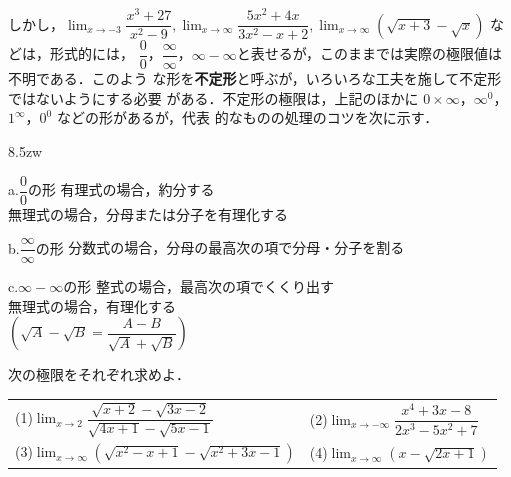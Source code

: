 しかし，$\lim_{x\to -3}\dfrac{x^{3}+27}{x^{2}-9}, \lim_{x\rightarrow\infty}\dfrac{5x^{2}+4x}{3x^{2}-x+2}, \lim_{x\rightarrow\infty} (\sqrt{x+3}-\sqrt{x})$ などは，形式的には，
$\dfrac{0}{0}$，$\dfrac{\infty}{\infty}$，$\infty-\infty$と表せるが，このままでは実際の極限値は不明である．このよう
な形を\textbf{不定形}と呼ぶが，いろいろな工夫を施して不定形ではないようにする必要
がある．不定形の極限は，上記のほかに $0\times\infty$，$\infty^{0}$，$1^{\infty}$，$0^{0}$ などの形があるが，代表
的なものの処理のコツを次に示す．
\begin{shadebox}
\begin{Description}{8.5zw}
\item[a.\quad $\dfrac{0}{0}$の形]有理式の場合，約分する\\
無理式の場合，分母または分子を有理化する
\item[b.\quad $\dfrac{\infty}{\infty}$の形] 分数式の場合，分母の最高次の項で分母・分子を割る
\item
[c.\quad $\infty-\infty$の形]整式の場合，最高次の項でくくり出す\\
無理式の場合，有理化する\\
$\left(\sqrt{A}-\sqrt{B}=\dfrac{A-B}{\sqrt{A}+\sqrt{B}}\right)$
\end{Description}
\end{shadebox}
\begin{例題}
次の極限をそれぞれ求めよ．
\begin{longtable}[l]{@{}l@{\hskip1zw}l}
(1)\quad  $\lim_{x\rightarrow 2}\dfrac{\sqrt{x+2}-\sqrt{3x-2}}{\sqrt{4x+1}-\sqrt{5x-1}}$ & (2)\quad $\lim_{x\to -\infty}\dfrac{x^4+3x-8}{2x^3-5x^2+7}$
\\[2mm]
(3)\quad $\lim_{x\rightarrow\infty}(\sqrt{x^{2}-x+1}-\sqrt{x^{2}+3x-1})$&  (4)\quad $\lim_{x\rightarrow\infty}(x-\sqrt{2x+1})$
\end{longtable}
\end{例題}

